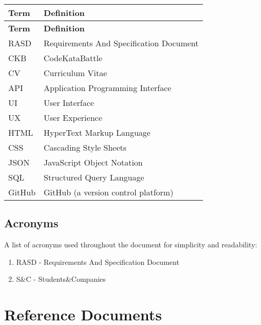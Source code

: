 \begin{longtable}{@{} l p{\textwidth} @{}}
\textbf{Term} & \textbf{Definition} \\
\hline
\endfirsthead

\textbf{Term} & \textbf{Definition} \\
\hline
\endhead

RASD & Requirements And Specification Document \\
CKB & CodeKataBattle \\
CV & Curriculum Vitae \\
API & Application Programming Interface \\
UI & User Interface \\
UX & User Experience \\
HTML & HyperText Markup Language \\
CSS & Cascading Style Sheets \\
JSON & JavaScript Object Notation \\
SQL & Structured Query Language \\
GitHub & GitHub (a version control platform) \\
\end{longtable}










\subsection{Acronyms}

A list of acronyms used throughout the document for simplicity and readability:

\begin{enumerate}
    \item RASD - Requirements And Specification Document
    \item S\&C - Students\&Companies
\end{enumerate}


\section{Reference Documents}

